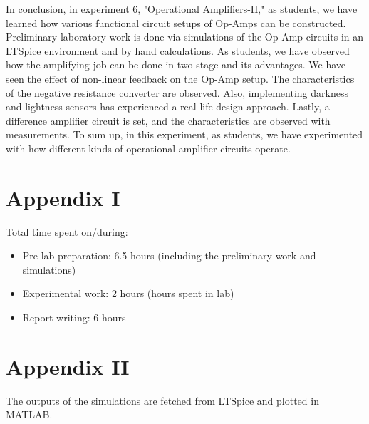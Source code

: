 \documentclass[letterpaper,12pt]{article}
\begin{document}
In conclusion, in experiment 6, "Operational Amplifiers-II," as students, we have learned how various functional circuit setups of Op-Amps can be constructed. Preliminary laboratory work is done via simulations of the Op-Amp circuits in an LTSpice environment and by hand calculations. As students, we have observed how the amplifying job can be done in two-stage and its advantages. We have seen the effect of non-linear feedback on the Op-Amp setup. The characteristics of the negative resistance converter are observed. Also, implementing darkness and lightness sensors has experienced a real-life design approach. Lastly, a difference amplifier circuit is set, and the characteristics are observed with measurements. To sum up, in this experiment, as students, we have experimented with how different kinds of operational amplifier circuits operate. 
\section*{Appendix I}
Total time spent on/during:
\begin{itemize}
	\item Pre-lab preparation: 6.5 hours (including the preliminary work and simulations) 
	\item Experimental work: 2 hours (hours spent in lab)
	\item Report writing: 6 hours 
\end{itemize}
\section*{Appendix II}
The outputs of the simulations are fetched from LTSpice and plotted in MATLAB.



\end{document}

